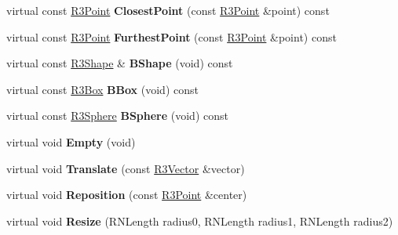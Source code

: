 \begin{DoxyCompactItemize}
\item 
virtual const \hyperlink{class_r3_point}{R3\+Point} {\bfseries Closest\+Point} (const \hyperlink{class_r3_point}{R3\+Point} \&point) const \hypertarget{class_r3_oriented_box_a56d278fc5d1fc5fb329af0fcfe4ab31f}{}\label{class_r3_oriented_box_a56d278fc5d1fc5fb329af0fcfe4ab31f}

\item 
virtual const \hyperlink{class_r3_point}{R3\+Point} {\bfseries Furthest\+Point} (const \hyperlink{class_r3_point}{R3\+Point} \&point) const \hypertarget{class_r3_oriented_box_a5584bfed95d462b36bef26f30ce5d83b}{}\label{class_r3_oriented_box_a5584bfed95d462b36bef26f30ce5d83b}

\item 
virtual const \hyperlink{class_r3_shape}{R3\+Shape} \& {\bfseries B\+Shape} (void) const \hypertarget{class_r3_oriented_box_ae818d40761cc8ac0da5ae9c9a1ff3002}{}\label{class_r3_oriented_box_ae818d40761cc8ac0da5ae9c9a1ff3002}

\item 
virtual const \hyperlink{class_r3_box}{R3\+Box} {\bfseries B\+Box} (void) const \hypertarget{class_r3_oriented_box_ab2a7f8e0dfc7079d41b6f80c7efe35c3}{}\label{class_r3_oriented_box_ab2a7f8e0dfc7079d41b6f80c7efe35c3}

\item 
virtual const \hyperlink{class_r3_sphere}{R3\+Sphere} {\bfseries B\+Sphere} (void) const \hypertarget{class_r3_oriented_box_af604ff36dacf9183249d0ae3c0c36d87}{}\label{class_r3_oriented_box_af604ff36dacf9183249d0ae3c0c36d87}

\item 
virtual void {\bfseries Empty} (void)\hypertarget{class_r3_oriented_box_af5c8365a058cfa78cf7e3c062ffcd96b}{}\label{class_r3_oriented_box_af5c8365a058cfa78cf7e3c062ffcd96b}

\item 
virtual void {\bfseries Translate} (const \hyperlink{class_r3_vector}{R3\+Vector} \&vector)\hypertarget{class_r3_oriented_box_afe9cf0c09cacfbf485eb91cc3a2c3766}{}\label{class_r3_oriented_box_afe9cf0c09cacfbf485eb91cc3a2c3766}

\item 
virtual void {\bfseries Reposition} (const \hyperlink{class_r3_point}{R3\+Point} \&center)\hypertarget{class_r3_oriented_box_aeed49c7c6c2e1735e9c35672bfb06e07}{}\label{class_r3_oriented_box_aeed49c7c6c2e1735e9c35672bfb06e07}

\item 
virtual void {\bfseries Resize} (R\+N\+Length radius0, R\+N\+Length radius1, R\+N\+Length radius2)\hypertarget{class_r3_oriented_box_af6b7b6f80b4ae8ac2f9b5fc32b776175}{}\label{class_r3_oriented_box_af6b7b6f80b4ae8ac2f9b5fc32b776175}


\end{DoxyCompactItemize}
